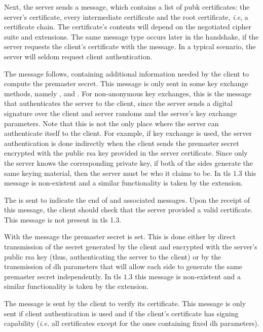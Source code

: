 \documentclass{llncs}
\begin{document}
{Next, the server sends a  message, which contains a list
of \gls{pubk} certificates: the server's certificate,
every intermediate certificate and the root certificate, \textit{i.e}, a certificate chain. The certificate's contents
will depend on the negotiated cipher suite and extensions.
The same message type occurs later in the handshake, if the server requests the client's certificate with the
 message. In a typical scenario, the
server will seldom request client authentication.

The  message follows, containing additional information
needed by the client to compute the premaster secret. This message
is only sent in some key exchange methods, namely , 
and . For non-anonymous key exchanges, this is the message that authenticates the server to the client,
since the server sends a digital signature over the client and server randoms
and the server's key exchange parameters. Note that this is not the only place where the
server can authenticate itself to the client. For example, if  key
exchange is used, the server authentication is done indirectly when the client
sends the premaster secret encrypted with the public \gls{rsa} key provided in the
server certificate. Since only the server knows the corresponding private key, if
both of the sides generate the same keying material, then the server must be who
it claims to be. In \gls{tls} $1.3$ this message is non-existent and a similar
functionality is taken by the  extension.

The  is sent to indicate the end of 
and associated messages. Upon the receipt of this message, the client should check
that the server provided a valid certificate. This message is not present in \gls{tls} 1.3.

With the  message the premaster secret is
set. This is done either by direct transmission of the secret generated by the client
and encrypted with the server's public \gls{rsa} key (thus, authenticating the server to the client)
or by the transmission of \gls{dh} parameters that will allow each side to generate
the same premaster secret independently. In \gls{tls} $1.3$ this message is
non-existent and a similar functionality is taken by the
 extension.

The  message is sent by the client to verify its
certificate. This message is only sent if client authentication is used and
if the client's certificate has signing capability (\textit{i.e.} all certificates except for the ones
containing fixed \gls{dh} parameters).

}
\end{document}
